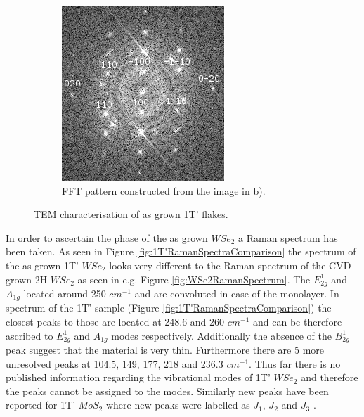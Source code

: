 \begin{figure}[H]
\begin{center}
\begin{subfigure}[b]{0.4\textwidth}
			\includegraphics[width=\textwidth]{1T'/TEMEDFFT.png}
			\caption{FFT pattern constructed from the image in b).}
			\label{fig:1T'TEMEDFET}
		\end{subfigure}
		\caption{TEM characterisation of as grown 1T' flakes.}
		\label{fig:1T'TEMMaps}
	\end{center}
\end{figure}

In order to ascertain the phase of the as grown $WSe_2$ a Raman spectrum has been taken. As seen in Figure \ref{fig:1T'RamanSpectraComparison} the spectrum of the as grown 1T' $WSe_2$ looks very different to the Raman spectrum of the CVD grown 2H $WSe_2$ as seen in e.g. Figure \ref{fig:WSe2RamanSpectrum}. The $E^1_{2g}$ and $A_{1g}$ located around 250 $cm^{-1}$ and are convoluted in case of the monolayer. In spectrum of the 1T' sample (Figure \ref{fig:1T'RamanSpectraComparison}) the closest peaks to those are located at 248.6 and 260 $cm^{-1}$ and can be therefore ascribed to $E^1_{2g}$ and $A_{1g}$ modes respectively. Additionally the absence of the $B^1_{2g}$ peak suggest that the material is very thin. Furthermore there are 5 more unresolved peaks at 104.5, 149, 177, 218 and 236.3 $cm^{-1}$. Thus far there is no published information regarding the vibrational modes of 1T' $WSe_2$ and therefore the peaks cannot be assigned to the modes. Similarly new peaks have been reported for 1T' $MoS_2$ where new peaks were labelled as $J_1$, $J_2$ and $J_3$ \cite{Yu2018}.

